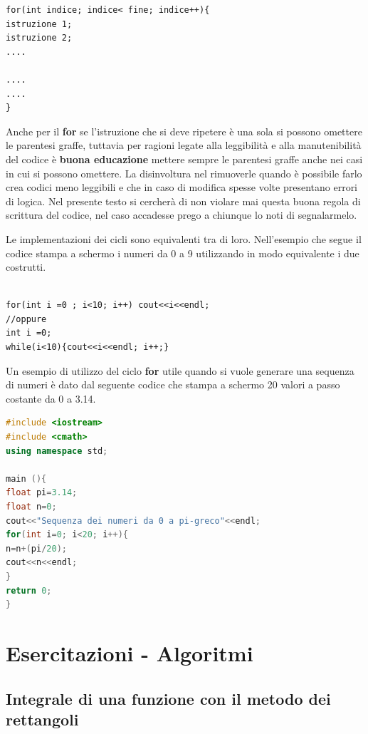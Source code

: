 \documentclass[11pt,fleqn]{book} %
\begin{document}
\begin{verbatim}
for(int indice; indice< fine; indice++){
istruzione 1;
istruzione 2;
....

....
....
}
\end{verbatim}
Anche per il \textbf{for} se l'istruzione che si deve ripetere è una sola si possono omettere le parentesi graffe, tuttavia per ragioni legate alla leggibilità e alla manutenibilità del codice è \textbf{buona educazione} mettere sempre le parentesi graffe anche nei casi in cui si possono omettere. La disinvoltura nel rimuoverle quando è possibile farlo crea codici meno leggibili e che in caso di modifica spesse volte presentano errori di logica. Nel presente testo si cercherà di non violare mai questa buona regola di scrittura del codice, nel caso accadesse prego a chiunque lo noti di segnalarmelo.

Le implementazioni dei cicli sono equivalenti tra di loro. Nell'esempio che segue il codice stampa a schermo i numeri da 0 a 9 utilizzando in modo equivalente i due costrutti.

\begin{verbatim}

for(int i =0 ; i<10; i++) cout<<i<<endl;
//oppure
int i =0;
while(i<10){cout<<i<<endl; i++;}
\end{verbatim}

Un esempio di utilizzo del ciclo \textbf{for} utile quando si vuole generare una sequenza di numeri è dato dal seguente codice che stampa a schermo 20 valori a passo costante da 0 a 3.14.

\begin{lstlisting}[language=c++]
#include <iostream>
#include <cmath>
using namespace std;

main (){
float pi=3.14;
float n=0;
cout<<"Sequenza dei numeri da 0 a pi-greco"<<endl;
for(int i=0; i<20; i++){
n=n+(pi/20);
cout<<n<<endl;
}
return 0;
}
\end{lstlisting}




\section{Esercitazioni - Algoritmi}


\subsection{Integrale di una funzione con il metodo dei rettangoli}
\end{document}
